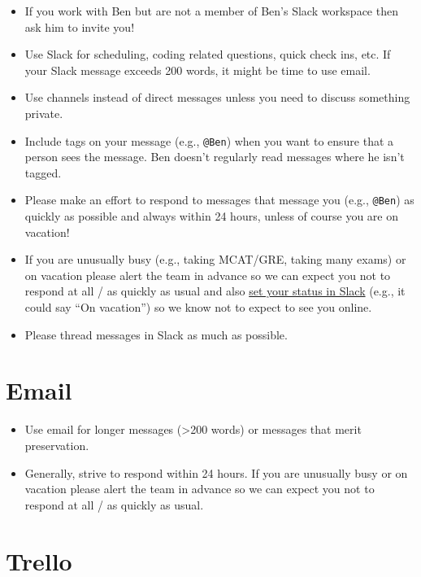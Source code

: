 \documentclass[]{book}
\providecommand{\tightlist}{%
  \setlength{\itemsep}{0pt}\setlength{\parskip}{0pt}}
\begin{document}
\begin{itemize}
\item
  If you work with Ben but are not a member of Ben's Slack workspace then ask him to invite you!
\item
  Use Slack for scheduling, coding related questions, quick check ins, etc. If your Slack message exceeds 200 words, it might be time to use email.
\item
  Use channels instead of direct messages unless you need to discuss something private.
\item
  Include tags on your message (e.g., \texttt{@Ben}) when you want to ensure that a person sees the message. Ben doesn't regularly read messages where he isn't tagged.
\item
  Please make an effort to respond to messages that message you (e.g., \texttt{@Ben}) as quickly as possible and always within 24 hours, unless of course you are on vacation!
\item
  If you are unusually busy (e.g., taking MCAT/GRE, taking many exams) or on vacation please alert the team in advance so we can expect you not to respond at all / as quickly as usual and also \href{https://get.slack.help/hc/en-us/articles/201864558-Set-your-Slack-status-and-availability}{set your status in Slack} (e.g., it could say ``On vacation'') so we know not to expect to see you online.
\item
  Please thread messages in Slack as much as possible.
\end{itemize}

\hypertarget{email}{%
\section{Email}\label{email}}

\begin{itemize}
\tightlist
\item
  Use email for longer messages (\textgreater{}200 words) or messages that merit preservation.
\item
  Generally, strive to respond within 24 hours. If you are unusually busy or on vacation please alert the team in advance so we can expect you not to respond at all / as quickly as usual.
\end{itemize}

\hypertarget{trello}{%
\section{Trello}\label{trello}}
\end{document}

